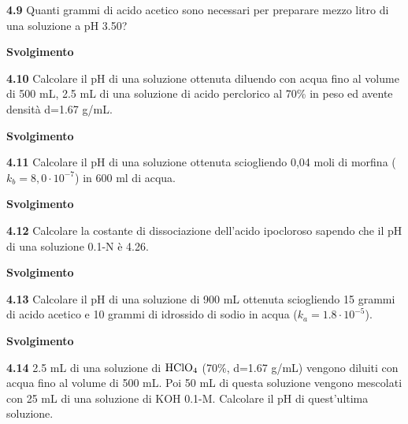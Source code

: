 \vspace{0.2cm}

\vspace{0.2cm}\textbf{4.9} Quanti grammi di acido acetico sono necessari per preparare mezzo litro di una soluzione a pH 3.50?

\vspace{0.2cm}\large\textbf{Svolgimento}\normalsize

\vspace{0.2cm}

\vspace{0.2cm}\textbf{4.10} Calcolare il pH di una soluzione ottenuta diluendo con acqua fino al volume di 500 mL, 2.5 mL
di una soluzione di acido perclorico al 70\% in peso ed avente densità d=1.67 g/mL.

\vspace{0.2cm}\large\textbf{Svolgimento}\normalsize

\vspace{0.2cm}

\vspace{0.2cm}\textbf{4.11} Calcolare il pH di una soluzione ottenuta sciogliendo 0,04 moli di morfina ($k_b = 8,0 \cdot 10^{-7}$) in 600 ml di acqua.

\vspace{0.2cm}\large\textbf{Svolgimento}\normalsize

\vspace{0.2cm}

\vspace{0.2cm}\textbf{4.12} Calcolare la costante di dissociazione dell’acido ipocloroso sapendo che il pH di una soluzione 0.1-N è 4.26.

\vspace{0.2cm}\large\textbf{Svolgimento}\normalsize

\vspace{0.2cm}

\vspace{0.2cm}\textbf{4.13} Calcolare il pH di una soluzione di 900 mL ottenuta sciogliendo 15 grammi di acido acetico e 10 grammi di idrossido di sodio in acqua ($k_a = 1.8 \cdot 10^{-5}$).

\vspace{0.2cm}\large\textbf{Svolgimento}\normalsize

\vspace{0.2cm}

\vspace{0.2cm}\textbf{4.14} 2.5 mL di una soluzione di $\rm HClO_4$ (70\%, d=1.67 g/mL) vengono diluiti con acqua fino al
volume di 500 mL. Poi 50 mL di questa soluzione vengono mescolati con 25 mL di una soluzione di KOH 0.1-M. Calcolare il pH di quest’ultima soluzione.

